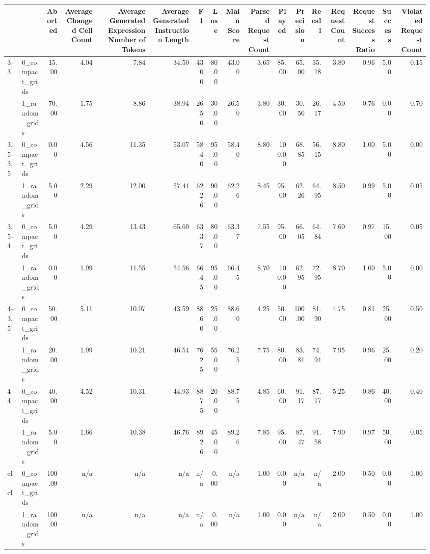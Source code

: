 \begin{tabular}{llrrrrrrrrrrrrrrr}
\toprule
 &  & Aborted & Average Changed Cell Count & Average Generated Expression Number of Tokens & Average Generated Instruction Length & F1 & Lose & Main Score & Parsed Request Count & Played & Precision & Recall & Request Count & Request Success Ratio & Success & Violated Request Count \\
\midrule
\multirow[t]{2}{*}{3--3} & 0_compact_grids & 15.00 & 4.04 & 7.84 & 34.50 & 43.00 & 80.00 & 43.00 & 3.65 & 85.00 & 65.00 & 35.18 & 3.80 & 0.96 & 5.00 & 0.15 \\
 & 1_random_grids & 70.00 & 1.75 & 8.86 & 38.94 & 26.50 & 30.00 & 26.50 & 3.80 & 30.00 & 30.50 & 26.17 & 4.50 & 0.76 & 0.00 & 0.70 \\
\cline{1-17}
\multirow[t]{2}{*}{3.5--3.5} & 0_compact_grids & 0.00 & 4.56 & 11.35 & 53.07 & 58.40 & 95.00 & 58.40 & 8.80 & 100.00 & 68.85 & 56.15 & 8.80 & 1.00 & 5.00 & 0.00 \\
 & 1_random_grids & 5.00 & 2.29 & 12.00 & 57.44 & 62.26 & 90.00 & 62.26 & 8.45 & 95.00 & 62.26 & 64.95 & 8.50 & 0.99 & 5.00 & 0.05 \\
\cline{1-17}
\multirow[t]{2}{*}{3.5--4} & 0_compact_grids & 5.00 & 4.29 & 13.43 & 65.60 & 63.37 & 80.00 & 63.37 & 7.55 & 95.00 & 66.05 & 64.84 & 7.60 & 0.97 & 15.00 & 0.05 \\
 & 1_random_grids & 0.00 & 1.99 & 11.55 & 54.56 & 66.45 & 95.00 & 66.45 & 8.70 & 100.00 & 62.95 & 72.95 & 8.70 & 1.00 & 5.00 & 0.00 \\
\cline{1-17}
\multirow[t]{2}{*}{4--3.5} & 0_compact_grids & 50.00 & 5.11 & 10.07 & 43.59 & 88.60 & 25.00 & 88.60 & 4.25 & 50.00 & 100.00 & 81.90 & 4.75 & 0.81 & 25.00 & 0.50 \\
 & 1_random_grids & 20.00 & 1.99 & 10.21 & 46.54 & 76.25 & 55.00 & 76.25 & 7.75 & 80.00 & 83.81 & 74.94 & 7.95 & 0.96 & 25.00 & 0.20 \\
\cline{1-17}
\multirow[t]{2}{*}{4--4} & 0_compact_grids & 40.00 & 4.52 & 10.31 & 44.93 & 88.75 & 20.00 & 88.75 & 4.85 & 60.00 & 91.17 & 87.17 & 5.25 & 0.86 & 40.00 & 0.40 \\
 & 1_random_grids & 5.00 & 1.66 & 10.38 & 46.76 & 89.26 & 45.00 & 89.26 & 7.85 & 95.00 & 87.47 & 91.58 & 7.90 & 0.97 & 50.00 & 0.05 \\
\cline{1-17}
\multirow[t]{2}{*}{cl--cl} & 0_compact_grids & 100.00 & n/a & n/a & n/a & n/a & 0.00 & n/a & 1.00 & 0.00 & n/a & n/a & 2.00 & 0.50 & 0.00 & 1.00 \\
 & 1_random_grids & 100.00 & n/a & n/a & n/a & n/a & 0.00 & n/a & 1.00 & 0.00 & n/a & n/a & 2.00 & 0.50 & 0.00 & 1.00 \\

\end{tabular}
